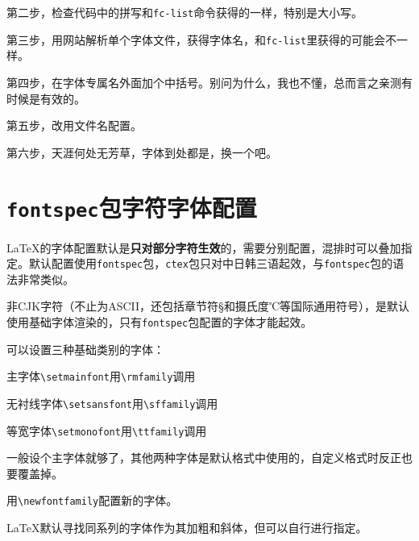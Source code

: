 \documentclass[10pt,openany]{book}
\begin{document}
\begin{sloppypar}
    第二步，检查代码中的拼写和\texttt{fc-list}命令获得的一样，特别是大小写。

    第三步，用网站解析单个字体文件，获得字体名，和\texttt{fc-list}里获得的可能会不一样。

    第四步，在字体专属名外面加个中括号。别问为什么，我也不懂，总而言之亲测有时候是有效的。

    

    第五步，改用文件名配置。

    第六步，天涯何处无芳草，字体到处都是，换一个吧。

    \section{\texorpdfstring{\texttt{fontspec}包字符字体配置}{fontspec包字符字体配置}}

     {\LaTeX}的字体配置默认是\textbf{只对部分字符生效}的，需要分别配置，混排时可以叠加指定。默认配置使用\texttt{fontspec}包，\texttt{ctex}包只对中日韩三语起效，与\texttt{fontspec}包的语法非常类似。

    非CJK字符（不止为ASCII，还包括章节符{\S}和摄氏度{\tempfont ℃}等国际通用符号），是默认使用基础字体渲染的，只有\texttt{fontspec}包配置的字体才能起效。

    

    可以设置三种基础类别的字体：

    \begin{tightitem}
        \item 主字体\texttt{\textbackslash{}setmainfont}用\texttt{\textbackslash{}rmfamily}调用
        \item 无衬线字体\texttt{\textbackslash{}setsansfont}用\texttt{\textbackslash{}sffamily}调用
        \item 等宽字体\texttt{\textbackslash{}setmonofont}用\texttt{\textbackslash{}ttfamily}调用
    \end{tightitem}

    一般设个主字体就够了，其他两种字体是默认格式中使用的，自定义格式时反正也要覆盖掉。

    用\texttt{\textbackslash{}newfontfamily}配置新的字体。

    

    {\LaTeX}默认寻找同系列的字体作为其加粗和斜体，但可以自行进行指定。


\end{sloppypar}
\end{document}
